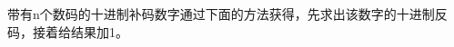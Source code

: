 带有n个数码的十进制补码数字通过下面的方法获得，先求出该数字的十进制反码，接着给结果加1。





















































































































